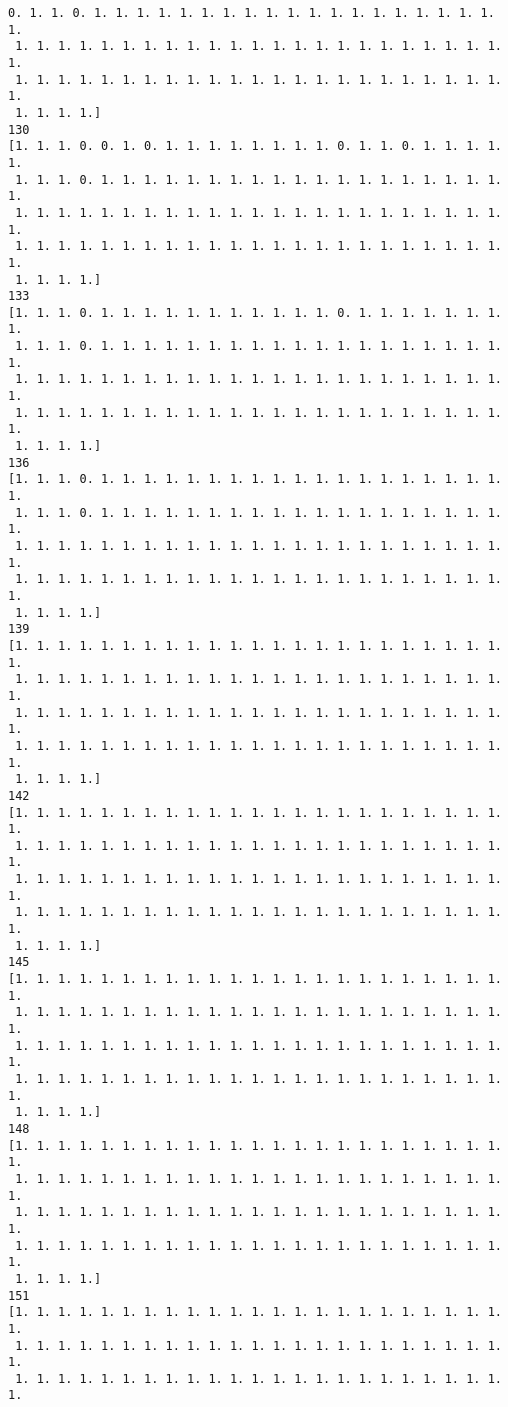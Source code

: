 \documentclass[11pt]{article}
\begin{document}
\begin{Verbatim}[commandchars=\\\{\}]
 0. 1. 1. 0. 1. 1. 1. 1. 1. 1. 1. 1. 1. 1. 1. 1. 1. 1. 1. 1. 1. 1. 1. 1.
 1. 1. 1. 1. 1. 1. 1. 1. 1. 1. 1. 1. 1. 1. 1. 1. 1. 1. 1. 1. 1. 1. 1. 1.
 1. 1. 1. 1. 1. 1. 1. 1. 1. 1. 1. 1. 1. 1. 1. 1. 1. 1. 1. 1. 1. 1. 1. 1.
 1. 1. 1. 1.]
130
[1. 1. 1. 0. 0. 1. 0. 1. 1. 1. 1. 1. 1. 1. 1. 0. 1. 1. 0. 1. 1. 1. 1. 1.
 1. 1. 1. 0. 1. 1. 1. 1. 1. 1. 1. 1. 1. 1. 1. 1. 1. 1. 1. 1. 1. 1. 1. 1.
 1. 1. 1. 1. 1. 1. 1. 1. 1. 1. 1. 1. 1. 1. 1. 1. 1. 1. 1. 1. 1. 1. 1. 1.
 1. 1. 1. 1. 1. 1. 1. 1. 1. 1. 1. 1. 1. 1. 1. 1. 1. 1. 1. 1. 1. 1. 1. 1.
 1. 1. 1. 1.]
133
[1. 1. 1. 0. 1. 1. 1. 1. 1. 1. 1. 1. 1. 1. 1. 0. 1. 1. 1. 1. 1. 1. 1. 1.
 1. 1. 1. 0. 1. 1. 1. 1. 1. 1. 1. 1. 1. 1. 1. 1. 1. 1. 1. 1. 1. 1. 1. 1.
 1. 1. 1. 1. 1. 1. 1. 1. 1. 1. 1. 1. 1. 1. 1. 1. 1. 1. 1. 1. 1. 1. 1. 1.
 1. 1. 1. 1. 1. 1. 1. 1. 1. 1. 1. 1. 1. 1. 1. 1. 1. 1. 1. 1. 1. 1. 1. 1.
 1. 1. 1. 1.]
136
[1. 1. 1. 0. 1. 1. 1. 1. 1. 1. 1. 1. 1. 1. 1. 1. 1. 1. 1. 1. 1. 1. 1. 1.
 1. 1. 1. 0. 1. 1. 1. 1. 1. 1. 1. 1. 1. 1. 1. 1. 1. 1. 1. 1. 1. 1. 1. 1.
 1. 1. 1. 1. 1. 1. 1. 1. 1. 1. 1. 1. 1. 1. 1. 1. 1. 1. 1. 1. 1. 1. 1. 1.
 1. 1. 1. 1. 1. 1. 1. 1. 1. 1. 1. 1. 1. 1. 1. 1. 1. 1. 1. 1. 1. 1. 1. 1.
 1. 1. 1. 1.]
139
[1. 1. 1. 1. 1. 1. 1. 1. 1. 1. 1. 1. 1. 1. 1. 1. 1. 1. 1. 1. 1. 1. 1. 1.
 1. 1. 1. 1. 1. 1. 1. 1. 1. 1. 1. 1. 1. 1. 1. 1. 1. 1. 1. 1. 1. 1. 1. 1.
 1. 1. 1. 1. 1. 1. 1. 1. 1. 1. 1. 1. 1. 1. 1. 1. 1. 1. 1. 1. 1. 1. 1. 1.
 1. 1. 1. 1. 1. 1. 1. 1. 1. 1. 1. 1. 1. 1. 1. 1. 1. 1. 1. 1. 1. 1. 1. 1.
 1. 1. 1. 1.]
142
[1. 1. 1. 1. 1. 1. 1. 1. 1. 1. 1. 1. 1. 1. 1. 1. 1. 1. 1. 1. 1. 1. 1. 1.
 1. 1. 1. 1. 1. 1. 1. 1. 1. 1. 1. 1. 1. 1. 1. 1. 1. 1. 1. 1. 1. 1. 1. 1.
 1. 1. 1. 1. 1. 1. 1. 1. 1. 1. 1. 1. 1. 1. 1. 1. 1. 1. 1. 1. 1. 1. 1. 1.
 1. 1. 1. 1. 1. 1. 1. 1. 1. 1. 1. 1. 1. 1. 1. 1. 1. 1. 1. 1. 1. 1. 1. 1.
 1. 1. 1. 1.]
145
[1. 1. 1. 1. 1. 1. 1. 1. 1. 1. 1. 1. 1. 1. 1. 1. 1. 1. 1. 1. 1. 1. 1. 1.
 1. 1. 1. 1. 1. 1. 1. 1. 1. 1. 1. 1. 1. 1. 1. 1. 1. 1. 1. 1. 1. 1. 1. 1.
 1. 1. 1. 1. 1. 1. 1. 1. 1. 1. 1. 1. 1. 1. 1. 1. 1. 1. 1. 1. 1. 1. 1. 1.
 1. 1. 1. 1. 1. 1. 1. 1. 1. 1. 1. 1. 1. 1. 1. 1. 1. 1. 1. 1. 1. 1. 1. 1.
 1. 1. 1. 1.]
148
[1. 1. 1. 1. 1. 1. 1. 1. 1. 1. 1. 1. 1. 1. 1. 1. 1. 1. 1. 1. 1. 1. 1. 1.
 1. 1. 1. 1. 1. 1. 1. 1. 1. 1. 1. 1. 1. 1. 1. 1. 1. 1. 1. 1. 1. 1. 1. 1.
 1. 1. 1. 1. 1. 1. 1. 1. 1. 1. 1. 1. 1. 1. 1. 1. 1. 1. 1. 1. 1. 1. 1. 1.
 1. 1. 1. 1. 1. 1. 1. 1. 1. 1. 1. 1. 1. 1. 1. 1. 1. 1. 1. 1. 1. 1. 1. 1.
 1. 1. 1. 1.]
151
[1. 1. 1. 1. 1. 1. 1. 1. 1. 1. 1. 1. 1. 1. 1. 1. 1. 1. 1. 1. 1. 1. 1. 1.
 1. 1. 1. 1. 1. 1. 1. 1. 1. 1. 1. 1. 1. 1. 1. 1. 1. 1. 1. 1. 1. 1. 1. 1.
 1. 1. 1. 1. 1. 1. 1. 1. 1. 1. 1. 1. 1. 1. 1. 1. 1. 1. 1. 1. 1. 1. 1. 1.

\end{Verbatim}
\end{document}
